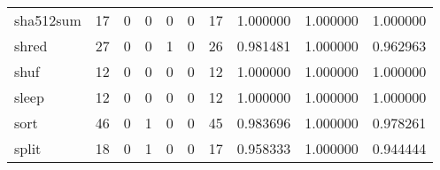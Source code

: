 \begin{longtable}{lrrrrrrrrr}
sha512sum &                                      17 &                                                  0 &                                                  0 &                                                  0 &                                                  0 &                                                 17 &                                           1.000000 &                               1.000000 &                             1.000000 \\
shred     &                                      27 &                                                  0 &                                                  0 &                                                  1 &                                                  0 &                                                 26 &                                           0.981481 &                               1.000000 &                             0.962963 \\
shuf      &                                      12 &                                                  0 &                                                  0 &                                                  0 &                                                  0 &                                                 12 &                                           1.000000 &                               1.000000 &                             1.000000 \\
sleep     &                                      12 &                                                  0 &                                                  0 &                                                  0 &                                                  0 &                                                 12 &                                           1.000000 &                               1.000000 &                             1.000000 \\
sort      &                                      46 &                                                  0 &                                                  1 &                                                  0 &                                                  0 &                                                 45 &                                           0.983696 &                               1.000000 &                             0.978261 \\
split     &                                      18 &                                                  0 &                                                  1 &                                                  0 &                                                  0 &                                                 17 &                                           0.958333 &                               1.000000 &                             0.944444 \\

\end{longtable}
